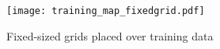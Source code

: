 % 
% 
% 
\begin{figure}[H]
    \texttt{[image: training\_map\_fixedgrid.pdf]}
    \caption{Fixed-sized grids placed over training data }
    \label{fig:gridsplit}
\end{figure} 


